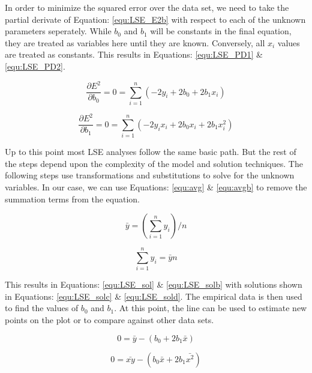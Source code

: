 In order to minimize the squared error over the data set, we need to take the partial derivate of Equation: \eqref{equ:LSE_E2b} with respect to each of the unknown parameters seperately. While $b_0$ and $b_1$ will be constants in the final equation, they are treated as variables here until they are known. Conversely, all $x_i$ values are treated as constants. This results in Equations: \eqref{equ:LSE_PD1} \& \eqref{equ:LSE_PD2}.

\begin{equation}
\label{equ:LSE_PD1}
\frac{\partial E^2}{\partial b_0} = 0 = \sum_{i=1}^{n} (-2y_i +2b_0 + 2b_1 x_i)
\end{equation}

\begin{equation}
\label{equ:LSE_PD2}
\frac{\partial E^2}{\partial b_1} = 0 = \sum_{i=1}^{n} (-2y_i x_i +2b_0 x_i + 2b_1 x_i^2)
\end{equation}

Up to this point most LSE analyses follow the same basic path. But the rest of the steps depend upon the complexity of the model and solution techniques. The following steps use transformations and substitutions to solve for the unknown variables. In our case, we can use Equations: \eqref{equ:avg} \& \eqref{equ:avgb} to remove the summation terms from the equation.

\begin{equation}
\label{equ:avg} 
\bar{y} = (\sum_{i=1}^{n} y_i) / n
\end{equation}

\begin{equation}
\label{equ:avgb} 
\sum_{i=1}^{n} y_i  = \bar{y}n
\end{equation}

This results in Equations: \eqref{equ:LSE_sol} \& \eqref{equ:LSE_solb} with solutions shown in Equations: \eqref{equ:LSE_solc} \& \eqref{equ:LSE_sold}. The empirical data is then used to find the values of $b_0$ and $b_1$. At this point, the line can be used to estimate new points on the plot or to compare against other data sets.

\begin{equation}
\label{equ:LSE_sol}
0 = \bar{y} - (b_0 + 2b_1 \bar{x})
\end{equation}

\begin{equation}
\label{equ:LSE_solb}
0 = \bar{xy} - (b_0 \bar{x} + 2b_1 \bar{x^2})
\end{equation}

